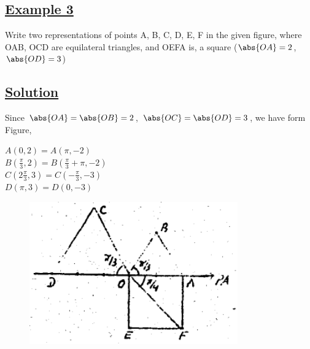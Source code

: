 \documentclass{amsbook}
\begin{document}
\subsection*{\underline{Example 3}} Write two representations of points A, B, C, D, E, F in the given figure, where OAB, OCD are equilateral triangles, and OEFA is, a square ($\abs{OA} = 2$, $\abs{OD} = 3$)

\subsection*{\underline{Solution}} Since $\abs{OA} = \abs{OB} = 2$, $\abs{OC} = \abs{OD} = 3$, we have form Figure,

\noindent $A (0 , 2) = A (\pi, -2)$ \\
$B (\frac{\pi}{3} , 2) = B (\frac{\pi}{3} + \pi, -2)$ \\
$C (2\frac{\pi}{3} , 3) = C (-\frac{\pi}{3} , -3)$ \\
$D (\pi , 3) = D (0 , -3)$ \\

\begin{figure}[h]
    \begin{minipage}{0.5\linewidth}
        \centering
        \includegraphics[width = 0.80\textwidth]{images/b1p2-302-fig01}
    \end{minipage}
\end{figure}
\end{document}
